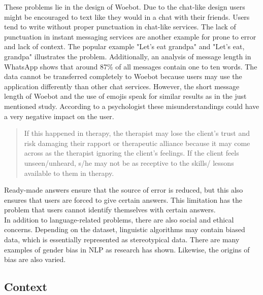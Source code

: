 These problems lie in the design of Woebot.
Due to the chat-like design users might be encouraged to text like they would in a chat with their friends.
Users tend to write without proper punctuation in chat-like services\cite{punctuation}.
The lack of punctuation in instant messaging services are another example for prone to error and lack of context.
The popular example "Let's eat grandpa" and "Let's eat, grandpa" illustrates the problem.
Additionally, an analysis of message length in WhatsApp shows that around 87\% of all messages contain one to ten words\cite{whatsapp-usage}.
The data cannot be transferred completely to Woebot because users may use the application differently than other chat services.
However, the short message length of Woebot and the use of emojis speak for similar results as in the just mentioned study.
According to a psychologist these misunderstandings could have a very negative impact on the user.

\begin{quote}
    If this happened in therapy, the therapist may lose the client's trust and risk damaging their rapport or therapeutic alliance because it may come across as the therapist ignoring the client's feelings.
    If the client feels unseen/unheard, s/he may not be as receptive to the skills/ lessons available to them in therapy\cite{investigating-students}.
\end{quote}

Ready-made answers ensure that the source of error is reduced, but this also ensures that users are forced to give certain answers.
This limitation has the problem that users cannot identify themselves with certain answers\cite{emoticons}.\\

In addition to language-related problems, there are also social and ethical concerns.
Depending on the dataset, linguistic algorithms may contain biased data, which is essentially represented as stereotypical data.
There are many examples of gender bias in NLP as research has shown\cite{gender-bias-nlp}.
Likewise, the origins of bias are also varied\cite{sources-bias-nlp}.\\




\subsection{Context}

